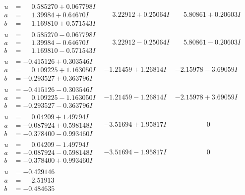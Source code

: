\documentclass[1p]{elsarticle_modified}
\theoremstyle{definition}
\begin{document}
$$\begin{array}{c|c|c}
\begin{aligned}
u &= \phantom{-}0.585270 + 0.067798 I \\
a &= \phantom{-}1.39984 + 0.64670 I \\
b &= \phantom{-}1.169810 + 0.571543 I\end{aligned}
 & \phantom{-}3.22912 + 0.25064 I & \phantom{-}5.80861 + 0.20603 I \\ \hline\begin{aligned}
u &= \phantom{-}0.585270 - 0.067798 I \\
a &= \phantom{-}1.39984 - 0.64670 I \\
b &= \phantom{-}1.169810 - 0.571543 I\end{aligned}
 & \phantom{-}3.22912 - 0.25064 I & \phantom{-}5.80861 - 0.20603 I \\ \hline\begin{aligned}
u &= -0.415126 + 0.303546 I \\
a &= \phantom{-}0.109225 + 1.163050 I \\
b &= -0.293527 + 0.363796 I\end{aligned}
 & -1.21459 + 1.26814 I & -2.15978 - 3.69059 I \\ \hline\begin{aligned}
u &= -0.415126 - 0.303546 I \\
a &= \phantom{-}0.109225 - 1.163050 I \\
b &= -0.293527 - 0.363796 I\end{aligned}
 & -1.21459 - 1.26814 I & -2.15978 + 3.69059 I \\ \hline\begin{aligned}
u &= \phantom{-}0.04209 + 1.49794 I \\
a &= -0.087924 + 0.598148 I \\
b &= -0.378400 - 0.993460 I\end{aligned}
 & -3.51694 + 1.95817 I & \phantom{-0.000000 } 0 \\ \hline\begin{aligned}
u &= \phantom{-}0.04209 - 1.49794 I \\
a &= -0.087924 - 0.598148 I \\
b &= -0.378400 + 0.993460 I\end{aligned}
 & -3.51694 - 1.95817 I & \phantom{-0.000000 } 0 \\ \hline\begin{aligned}
u &= -0.429146\phantom{ +0.000000I} \\
a &= \phantom{-}2.51913\phantom{ +0.000000I} \\
b &= -0.484635\phantom{ +0.000000I}\end{aligned}

\end{array}$$
\end{document}
